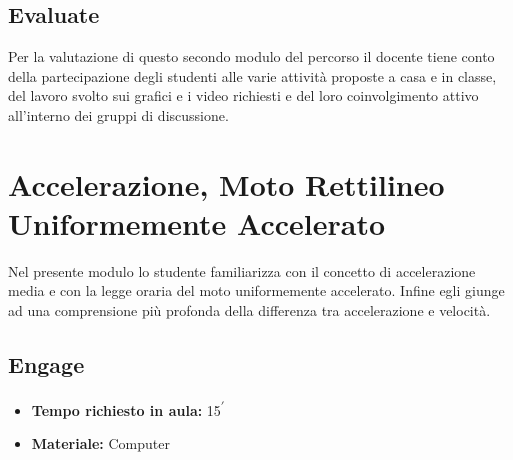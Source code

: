 \documentclass{report} \usepackage[T1]{fontenc} \usepackage[italian]{babel}
\begin{document}
\section{Evaluate}
Per la valutazione di questo secondo modulo del percorso il docente tiene conto della
partecipazione degli studenti alle varie attività proposte a casa e in classe,
del lavoro svolto sui grafici e i video richiesti e del loro coinvolgimento attivo
all’interno dei gruppi di discussione.

\chapter{Accelerazione, Moto Rettilineo Uniformemente Accelerato}
Nel presente modulo lo studente familiarizza con il concetto di accelerazione
media e con la legge oraria del moto uniformemente accelerato.
Infine egli giunge ad una comprensione più profonda della differenza
tra accelerazione e velocità.

\section{Engage}

\begin{itemize}
\item \textbf{Tempo richiesto in aula:} 15\textsuperscript{$\prime$}
\item \textbf{Materiale:} Computer
\end{itemize}
\end{document}
